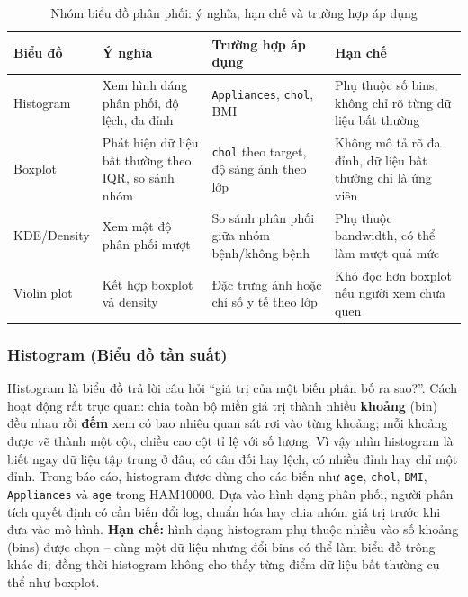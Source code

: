 \begin{table}[H]
\centering
\caption{Nhóm biểu đồ phân phối: ý nghĩa, hạn chế và trường hợp áp dụng}
\label{tab:chapter1_distribution_chart_group}
\small
\begin{tabular}{p{}p{}p{}p{}}
\toprule
Biểu đồ & Ý nghĩa & Trường hợp áp dụng & Hạn chế \\
\midrule
Histogram & Xem hình dáng phân phối, độ lệch, đa đỉnh & \texttt{Appliances}, \texttt{chol}, BMI & Phụ thuộc số bins, không chỉ rõ từng dữ liệu bất thường \\
Boxplot & Phát hiện dữ liệu bất thường theo IQR, so sánh nhóm & \texttt{chol} theo target, độ sáng ảnh theo lớp & Không mô tả rõ đa đỉnh, dữ liệu bất thường chỉ là ứng viên \\
KDE/Density & Xem mật độ phân phối mượt & So sánh phân phối giữa nhóm bệnh/không bệnh & Phụ thuộc bandwidth, có thể làm mượt quá mức \\
Violin plot & Kết hợp boxplot và density & Đặc trưng ảnh hoặc chỉ số y tế theo lớp & Khó đọc hơn boxplot nếu người xem chưa quen \\
\bottomrule
\end{tabular}
\end{table}

\subsubsection{Histogram (Biểu đồ tần suất)}

Histogram là biểu đồ trả lời câu hỏi ``giá trị của một biến phân bố ra sao?''. Cách hoạt động rất trực quan: chia toàn bộ miền giá trị thành nhiều \textbf{khoảng} (bin) đều nhau rồi \textbf{đếm} xem có bao nhiêu quan sát rơi vào từng khoảng; mỗi khoảng được vẽ thành một cột, chiều cao cột tỉ lệ với số lượng. Vì vậy nhìn histogram là biết ngay dữ liệu tập trung ở đâu, có cân đối hay lệch, có nhiều đỉnh hay chỉ một đỉnh. Trong báo cáo, histogram được dùng cho các biến như \texttt{age}, \texttt{chol}, \texttt{BMI}, \texttt{Appliances} và \texttt{age} trong HAM10000. Dựa vào hình dạng phân phối, người phân tích quyết định có cần biến đổi log, chuẩn hóa hay chia nhóm giá trị trước khi đưa vào mô hình. \textbf{Hạn chế:} hình dạng histogram phụ thuộc nhiều vào số khoảng (bins) được chọn -- cùng một dữ liệu nhưng đổi bins có thể làm biểu đồ trông khác đi; đồng thời histogram không cho thấy từng điểm dữ liệu bất thường cụ thể như boxplot.

